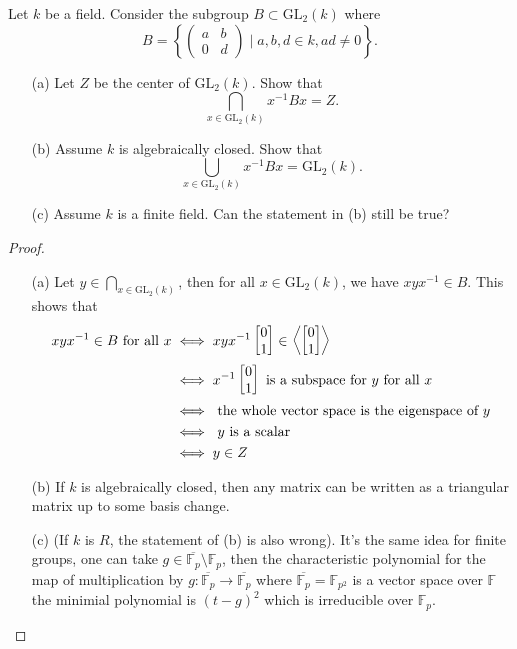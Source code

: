 \begin{prob}[S2008-Q1]
    Let \(k\) be a field. Consider the subgroup \(B \subset \text{GL}_2(k)\) where
    \[B = \left\{ \begin{pmatrix} a & b \\ 0 & d \end{pmatrix} \mid a, b, d \in k, ad \neq 0 \right\}.\]
    \begin{itemize}
        \item[(a)] Let \(Z\) be the center of \(\text{GL}_2(k)\). Show that
        \[\bigcap_{x \in \text{GL}_2(k)} x^{-1} Bx = Z.\]
        \item[(b)] Assume \(k\) is algebraically closed. Show that
        \[\bigcup_{x \in \text{GL}_2(k)} x^{-1} Bx = \text{GL}_2(k).\]
        \item[(c)] Assume \(k\) is a finite field. Can the statement in (b) still be true?
    \end{itemize}
\end{prob}
\begin{proof}
    \begin{itemize}
        \item[(a)] Let $y\in \bigcap_{x \in \text{GL}_2(k)}$, then for all $x\in\text{GL}_2(k)$, we have $xyx^{-1}\in B$. This shows that 
        \begin{align*}
            xyx^{-1}\in B\text{ for all }x&\iff xyx^{-1}\begin{bmatrix}
                0\\
                1
            \end{bmatrix}\in\left\langle\begin{bmatrix}
                0\\
                1
            \end{bmatrix}\right\rangle\\
            &\iff x^{-1}\begin{bmatrix}
                0\\
                1
            \end{bmatrix}
            \text{ is a subspace for } y \text{ for all }x\\
            &\iff \text{ the whole vector space is the eigenspace of }y\\
            &\iff \text{ $y$ is a scalar}\\
            &\iff y\in Z  
        \end{align*}
        \item[(b)] If $k$ is algebraically closed, then any matrix can be written as a triangular matrix up to some basis change.
        \item[(c)] (If $k$ is $R$, the statement of (b) is also wrong). It's the same idea for finite groups, one can take $g\in\overline{\mathbb{F}_p}\setminus\mathbb{F}_p$, then the characteristic polynomial for the map of multiplication by $g:\overline{\mathbb{F}_p}\to \overline{\mathbb{F}_p}$ where $\overline{\mathbb{F}_p}=\mathbb{F}_{p^2}$ is a vector space over $\mathbb{F}$ the minimial polynomial is $(t-g)^2$ which is irreducible over $\mathbb{F}_p$.
    \end{itemize}
\end{proof}

